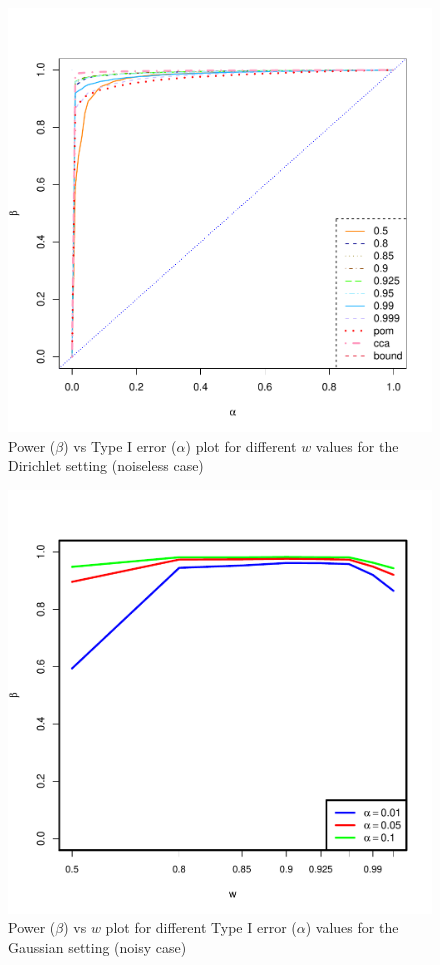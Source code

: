 \documentclass[11pt]{article} %
\begin{document}
\begin{figure}
\includegraphics[scale=0.35]{Dirichlet-FC-Tradeoff-OOSc0-n150.pdf}
\caption{Power ($\beta$) vs Type I error ($\alpha$) plot for different $w$ values for the Dirichlet setting (noiseless case)}
\label{fig:Dir-c0-power-alpha}
\end{figure}

\begin{figure}
\includegraphics[scale=0.95]{OOSDirichlet-power-w-c0-01.pdf}
\caption{Power ($\beta$) vs $w$ plot for different Type I error ($\alpha$) values for the Gaussian setting (noisy case)}
\label{fig:MVN-c001-power-w}
\end{figure}
\end{document}
